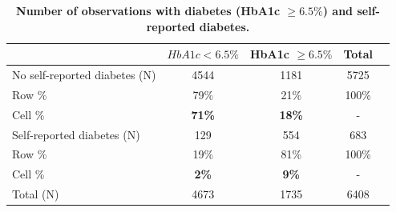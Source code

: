 \documentclass[12pt,english]{article}
\begin{document}
\begin{table}[!ht]
\begin{center}
\begin{adjustbox}{max width=\linewidth}
\begin{threeparttable}
{\begin{tablenotes}
					\end{tablenotes}
				}
			\end{threeparttable}
		\end{adjustbox}
	\end{center}
\end{table}

\clearpage

\begin{table}[!ht]
	\caption{\label{tab:Biomarker_observations}{\bf Number of observations with diabetes (HbA1c $\geq 6.5\%$) and self-reported diabetes.}}
	\begin{center}
		\begin{adjustbox}{max width=\linewidth}
			\begin{threeparttable}
				{
					\def\sym#1{\ifmmode^{#1}\else\(^{#1}\)\fi}
					\begin{tabular}{lcccc}
						\toprule
						&\multicolumn{1}{c}{$HbA1c < 6.5\%$}&\multicolumn{1}{c}{HbA1c $\geq 6.5\%$}&\multicolumn{1}{c}{Total}\\
						\midrule
						No self-reported diabetes (N) & 4544 & 1181 & 5725 &  \\
						\hspace*{10mm}Row  \% & 79\% & 21\% & 100\% &  \\
						\hspace*{10mm}Cell \% & \textbf{71\%} & \textbf{18\%} & - & \\
						Self-reported diabetes (N) & 129 & 554 & 683 &  \\
						\hspace*{10mm}Row \%  & 19\% & 81\% & 100\% &  \\
						\hspace*{10mm}Cell \% & \textbf{2\%} &\textbf{9\%} &- & \\
						Total (N) & 4673 & 1735 & 6408 &  \\ 
						\bottomrule
					\end{tabular}
					\begin{tablenotes}
						\item
					\end{tablenotes}
				}
			\end{threeparttable}
		\end{adjustbox}
	\end{center}
\end{table}


\clearpage
\end{document}
